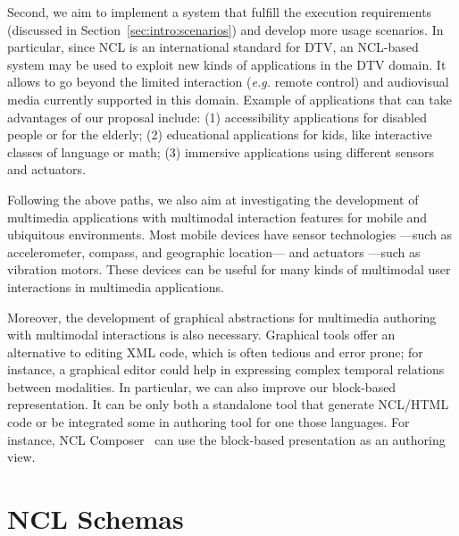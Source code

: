 \documentclass[
  doutorado,
  american
]{ThesisPUC}
\newcommand{\sect}[1]{Section~\ref{#1}}
\begin{document}
Second, we aim to implement a system that fulfill the execution requirements
(discussed in \sect{sec:intro:scenarios}) and develop more usage scenarios. In 
particular, since NCL is an international standard for DTV, an NCL-based system 
may be used to exploit new kinds of applications in the DTV domain. It allows 
to go beyond the limited interaction (\textit{e.g.} remote control) and 
audiovisual media currently supported in this domain. Example of applications 
that can take advantages of our proposal include: (1) accessibility 
applications for disabled people or for the elderly; (2) educational 
applications for kids, like interactive classes of language or math; (3) 
immersive applications using different sensors and actuators. 

Following the above paths, we also aim at investigating the development of
multimedia applications with multimodal interaction features for mobile and
ubiquitous environments. Most mobile devices have sensor technologies —such as
accelerometer, compass, and geographic location— and actuators —such as
vibration motors. These devices can be useful for many kinds of multimodal user
interactions in multimedia applications.

Moreover, the development of graphical abstractions for multimedia authoring
with multimodal interactions is also necessary. Graphical tools offer an
alternative to editing XML code, which is often tedious and error prone; for
instance, a graphical editor could help in expressing complex temporal relations
between modalities. In particular, we can also improve our block-based
representation. It can be only both a standalone tool that generate NCL/HTML
code or be integrated some in authoring tool for one those languages. For
instance, NCL Composer~\cite{azevedo_composer:_2014} can use the block-based
presentation as an authoring view.

{ \footnotesize 
 	\arial
 	
}
\normalfont
\appendix

\chapter{NCL Schemas}
\label{annex:schemas}
\end{document}
